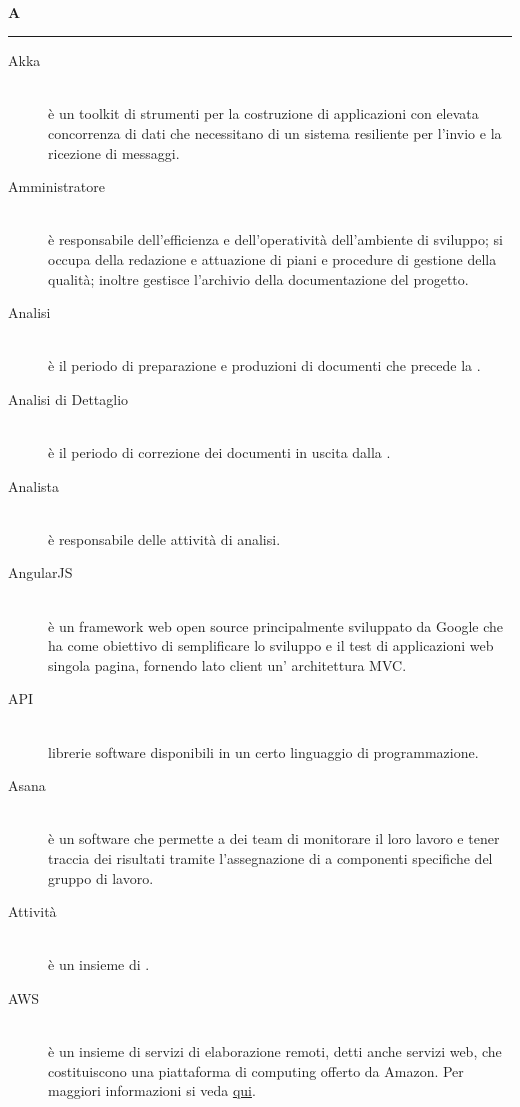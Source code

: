 \documentclass[12pt,a4paper]{article}
\begin{document}
\newpage

\begin{center}
\hfill\\
	\LARGE \textbf{A}
\hfill\\
\rule[15pt]{30pt}{0.5pt}
\end{center}

\begin{description}
\item[Akka] 
\hfill\\è un toolkit di strumenti per la costruzione di applicazioni con elevata concorrenza di dati che necessitano di un sistema resiliente per l'invio e la ricezione di messaggi.

\item[Amministratore] 
\hfill\\è responsabile dell'efficienza e dell'operatività dell'ambiente di sviluppo; si occupa della redazione e attuazione di piani e procedure di gestione della qualità; inoltre gestisce l'archivio della documentazione del progetto.

\item[Analisi]
\hfill\\è il periodo di preparazione e produzioni di documenti che precede la \RR.

\item[Analisi di Dettaglio]
\hfill\\è il periodo di correzione dei documenti in uscita dalla \RR.

\item[Analista]
\hfill\\è responsabile delle attività di analisi.

\item[AngularJS]
\hfill\\è un framework web open source principalmente sviluppato da Google che ha come obiettivo di semplificare lo sviluppo e il test di applicazioni web singola pagina, fornendo lato client un' architettura MVC.

\item[API]
\hfill\\librerie software disponibili in un certo linguaggio di programmazione.

\item[Asana]
\hfill\\è un software che permette a dei team di monitorare il loro lavoro e tener traccia dei risultati tramite l'assegnazione di  a componenti specifiche del gruppo di lavoro.

\item[Attività]
\hfill\\è un insieme di .

\item[AWS]
\hfill\\è un insieme di servizi di elaborazione remoti, detti anche servizi web, che costituiscono una piattaforma di computing offerto da Amazon. Per maggiori informazioni si veda \href{https://aws.amazon.com/it/}{qui}.
\end{description}
\end{document}
